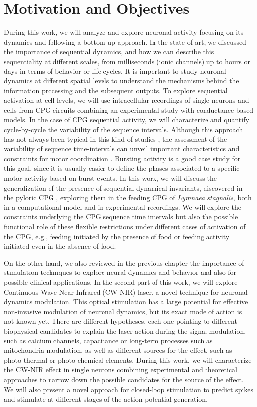 \chapter{Motivation and Objectives}\label{c-review}
During this work, we will analyze and explore neuronal activity focusing on its dynamics and following a bottom-up approach. In the state of art, we discussed the importance of sequential dynamics, and how we can describe this sequentiality at different scales, from milliseconds (ionic channels) up to hours or days in terms of behavior or life cycles. It is important to study neuronal dynamics at different spatial levels to understand the mechanisms behind the information processing and the subsequent outputs. To explore sequential activation at cell levels, we will use intracellular recordings of single neurons and cells from CPG circuits combining an experimental study with conductance-based models. In the case of CPG sequential activity, we will characterize and quantify cycle-by-cycle the variability of the sequence intervals. Although this approach has not always been typical in this kind of studies \parencite{anwar_interanimal_2022}, the assessment of the variability of sequence time-intervals can unveil important characteristics and constraints for motor coordination \parencite{elices_robust_2019}. Bursting activity is a good case study for this goal, since it is usually easier to define the phases associated to a specific motor activity based on burst events. In this work, we will discuss the generalization of the presence of sequential dynamical invariants, discovered in the pyloric CPG \parencite{elices_robust_2019}, exploring them in the feeding CPG of \textit{Lymnaea stagnalis}, both in a computational model and in experimental recordings. We will explore the constraints underlying the CPG sequence time intervals but also the possible functional role of these flexible restrictions under different cases of activation of the CPG, e.g., feeding initiated by the presence of food or feeding activity initiated even in the absence of food. 

On the other hand, we also reviewed in the previous chapter the importance of stimulation techniques to explore neural dynamics and behavior and also for possible clinical applications. In the second part of this work, we will explore Continuous-Wave Near-Infrared (CW-NIR) laser, a novel technique for neuronal dynamics modulation. This optical stimulation has a 
 large potential for effective non-invasive modulation of neuronal dynamics, but its exact mode of action is not known yet. There are different hypotheses, each one pointing to different biophysical candidates to explain the laser action  during the signal modulation, such as calcium channels, capacitance or long-term processes such as mitochondria modulation, as well as different sources for the effect, such as photo-thermal or photo-chemical elements. During this work, we will characterize the CW-NIR effect in single neurons combining experimental and theoretical approaches to narrow down the possible candidates for the source of the effect. We will also present a novel approach for closed-loop stimulation to predict spikes and stimulate at different stages of the action potential generation. 

